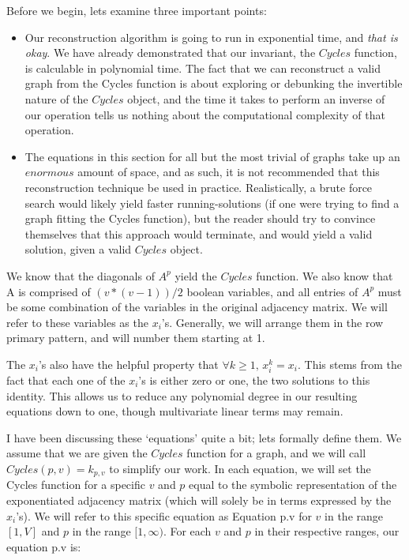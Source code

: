 Before we begin, lets examine three important points:
\begin{itemize}
  \item{
  	Our reconstruction algorithm is going to run in exponential time, and \emph{that is okay}.  
  	We have already demonstrated that our invariant, the $Cycles$ function, is calculable in polynomial time.  
  	The fact that we can reconstruct a valid graph from the Cycles function is about exploring or debunking the invertible nature of the $Cycles$ object, 
  	and the time it takes to perform an inverse of our operation tells us nothing about the computational complexity of that operation.
  }
  \item{
  	The equations in this section for all but the most trivial of graphs take up an $enormous$ amount of space, and as such, it is not recommended that this reconstruction technique be used in practice.  
  	Realistically, a brute force search would likely yield faster running-solutions (if one were trying to find a graph fitting the Cycles function), but the reader should try to convince themselves that this approach would terminate, 
  	and would yield a valid solution, given a valid $Cycles$ object.
  }
\end{itemize}

We know that the diagonals of $A^p$ yield the $Cycles$ function.
We also know that A is comprised of $(v * (v - 1)) / 2$ boolean variables, and all entries of $A^p$ must be some combination of the variables in the original adjacency matrix. 
We will refer to these variables as the $x_i$'s. Generally, we will arrange them in the row primary pattern, and will number them starting at 1.

The $x_i$'s also have the helpful property that $\forall k \geq 1,\, x_i^k = x_i $. 
This stems from the fact that each one of the $x_i$'s is either zero or one, the two solutions to this identity.  
This allows us to reduce any polynomial degree in our resulting equations down to one, though multivariate linear terms may remain.

I have been discussing these `equations' quite a bit; lets formally define them.  
We assume that we are given the $Cycles$ function for a graph, and we will call $Cycles(p, v) = k_{p, v}$ to simplify our work. 
In each equation, we will set the Cycles function for a specific $v$ and $p$ equal to the symbolic representation of the exponentiated adjacency matrix (which will solely be in terms expressed by the $x_i$'s).
We will refer to this specific equation as Equation p.v for $v$ in the range $[1, V]$ and $p$ in the range $[1, \infty)$.
For each $v$ and $p$ in their respective ranges, our equation p.v is:

